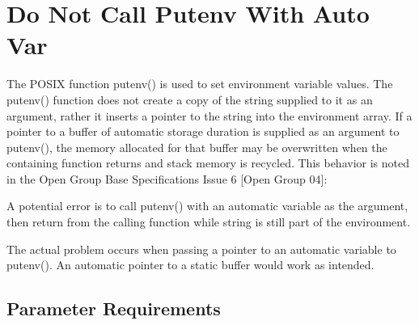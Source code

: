 %
%

\section{Do Not Call Putenv With Auto Var}
\label{DoNotCallPutenvWithAutoVar::overview}

The POSIX function putenv() is used to set environment variable values. The
putenv() function does not create a copy of the string supplied to it as an
argument, rather it inserts a pointer to the string into the environment array.
If a pointer to a buffer of automatic storage duration is supplied as an
argument to putenv(), the memory allocated for that buffer may be overwritten
when the containing function returns and stack memory is recycled. This behavior
is noted in the Open Group Base Specifications Issue 6 [Open Group 04]:

A potential error is to call putenv() with an automatic variable as the
argument, then return from the calling function while string is still part of
the environment.

The actual problem occurs when passing a pointer to an automatic variable to
putenv().  An automatic pointer to a static buffer would work as intended.

\subsection{Parameter Requirements}

